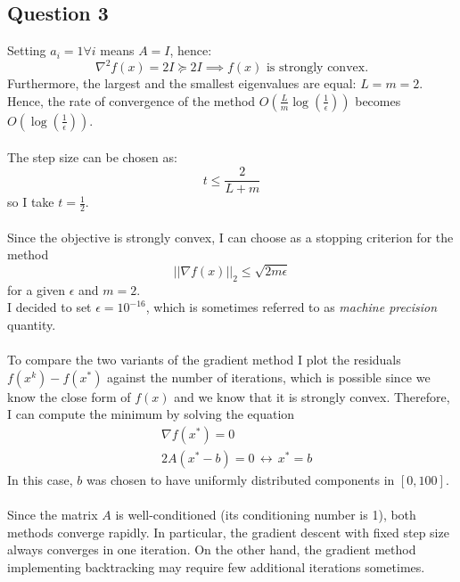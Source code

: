 \documentclass[]{article}
\begin{document}
\subsection*{Question 3}
Setting $a_i=1 \forall i$ means $A=I$, hence:
\begin{equation*}
	\nabla^2f(x)=2I\succeq2I \implies \text{$f(x)$ is strongly convex.}
\end{equation*}
Furthermore, the largest and the smallest eigenvalues are equal: $L=m=2$.\\
Hence, the rate of convergence of the method $O(\frac{L}{m}\log(\frac{1}{\epsilon}))$ becomes $O(\log(\frac{1}{\epsilon}))$.\\\\
The step size can be chosen as:
\begin{equation*}
	t\leq \frac{2}{L+m}
\end{equation*}
so I take $t=\frac{1}{2}$.\\\\
Since the objective is strongly convex, I can choose as a stopping criterion for the method
\begin{equation*}
	||\nabla f(x)||_2 \leq \sqrt{2m\epsilon}
\end{equation*}
for a given $\epsilon$ and $m=2$. \\
I decided to set $\epsilon = 10^{-16}$, which is sometimes referred to as \textit{machine precision} quantity.\\\\
To compare the two variants of the gradient method I plot the residuals $f(x^k) - f(x^*)$ against the number of iterations, which is possible since we know the close form of $f(x)$ and we know that it is strongly convex. Therefore, I can compute the minimum by solving the equation
\begin{equation}
	\begin{aligned}
		& \nabla f(x^*) = 0\\
		& 2A(x^*-b) = 0 \, \longleftrightarrow \, x^*=b
	\end{aligned}
\end{equation}
In this case, $b$ was chosen to have uniformly distributed components in $[0,100]$.\\\\
Since the matrix $A$ is well-conditioned (its conditioning number is 1), both methods converge rapidly. In particular, the gradient descent with fixed step size always converges in one iteration. On the other hand, the gradient method implementing backtracking may require few additional iterations sometimes.
\end{document}
